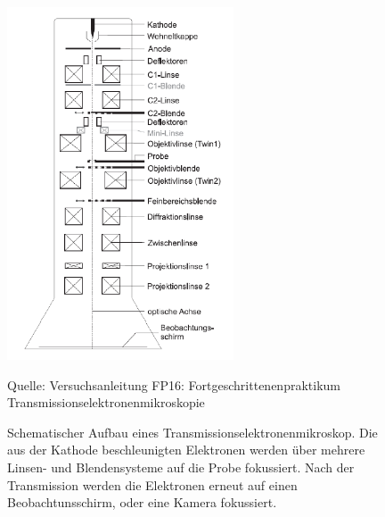 \documentclass[a4paper,11pt,DIV=11]{scrartcl}
\begin{document}
\begin{figure}[H]
\center
\includegraphics[width=0.6\textwidth]{tem.png}
\caption{Schematischer Aufbau eines Transmissionselektronenmikroskop. Die aus der Kathode beschleunigten Elektronen werden über mehrere Linsen- und Blendensysteme auf die Probe fokussiert. Nach der Transmission werden die Elektronen erneut auf einen Beobachtunsschirm, oder eine Kamera fokussiert.}
\begin{footnotesize}
\begin{flushleft}
Quelle: Versuchsanleitung FP16: Fortgeschrittenenpraktikum Transmissionselektronenmikroskopie
\end{flushleft}
\end{footnotesize}
\label{TEM}
\end{figure}
\end{document}
